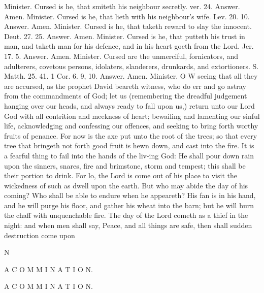 Minister. Cursed is he, that smiteth his neighbour secretly. ver. 24. Answer. Amen. Minister. Cursed is he, that lieth with his neighbour’s wife. Lev. 20. 10. Answer. Amen. Minister. Cursed is he, that taketh reward to slay the innocent. Deut. 27. 25. Answer. Amen. Minister. Cursed is he, that putteth his trust in man, and taketh man for his defence, and in his heart goeth from the Lord. Jer. 17. 5. Answer. Amen. Minister. Cursed are the unmerciful, fornicators, and adulterers, covetous persons, idolaters, slanderers, drunkards, and extortioners. S. Matth. 25. 41. 1 Cor. 6. 9, 10. Answer. Amen. Minister. O W seeing that all they are accursed, as the prophet David beareth witness, who do err and go astray from the commandments of God; let us (remembering the dreadful judgement hanging over our heads, and always ready to fall upon us,) return unto our Lord God with all contrition and meekness of heart; bewailing and lamenting our sinful life, acknowledging and confessing our offences, and seeking to bring forth worthy fruits of penance. For now is the axe put unto the root of the trees; so that every tree that bringeth not forth good fruit is hewn down, and cast into the fire. It is a fearful thing to fail into the hands of the liv-ing God: He shall pour down rain upon the sinners, snares, fire and brimstone, storm and tempest; this shall be their portion to drink. For lo, the Lord is come out of his place to visit the wickedness of such as dwell upon the earth. But who may abide the day of his coming? Who shall be able to endure when he appeareth? His fan is in his hand, and he will purge his floor, and gather his wheat into the barn; but he will burn the chaff with unquenchable fire. The day of the Lord cometh as a thief in the night: and when men shall say, Peace, and all things are safe, then shall sudden destruction come upon

N

A C O M M I N A T I O N.

A C O M M I N A T I O N.

